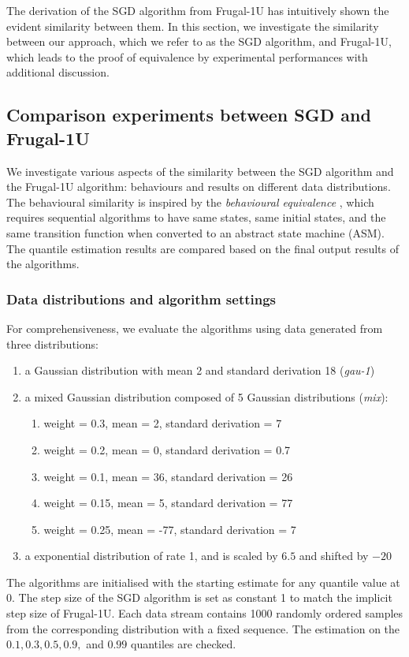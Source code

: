 The derivation of the SGD algorithm from Frugal-1U has intuitively shown the evident similarity between them. In this section, we investigate the similarity between our approach, which we refer to as the SGD algorithm, and Frugal-1U, which leads to the proof of equivalence by experimental performances with additional discussion.

\subsection{Comparison experiments between SGD and Frugal-1U}

We investigate various aspects of the similarity between the SGD algorithm and the Frugal-1U algorithm: behaviours and results on different data distributions. The behavioural similarity is inspired by the \textit{behavioural equivalence} \cite{gurevichSequentialAbstractstateMachines2000}, which requires sequential algorithms to have same states, same initial states, and the same transition function when converted to an abstract state machine (ASM). The quantile estimation results are compared based on the final output results of the algorithms.

\subsubsection{Data distributions and algorithm settings}
\label{subsubsec: distro_and_setting}
For comprehensiveness, we evaluate the algorithms using data generated from three distributions:
    \begin{enumerate}
        \item a Gaussian distribution with mean 2 and standard derivation 18 (\textit{gau-1})
        \item a mixed Gaussian distribution composed of 5 Gaussian distributions (\textit{mix}):
            \begin{enumerate}
                \item weight = 0.3, mean = 2, standard derivation = 7
                \item weight = 0.2, mean = 0, standard derivation = 0.7
                \item weight = 0.1, mean = 36, standard derivation = 26
                \item weight = 0.15, mean = 5, standard derivation = 77
                \item weight = 0.25, mean = -77, standard derivation = 7
            \end{enumerate}
            \item a exponential distribution of rate 1, and is scaled by $6.5$ and shifted by $-20$
    \end{enumerate}
The algorithms are initialised with the starting estimate for any quantile value at $0$. The step size of the SGD algorithm is set as constant 1 to match the implicit step size of Frugal-1U. Each data stream contains 1000 randomly ordered samples from the corresponding distribution with a fixed sequence. The estimation on the $0.1, 0.3, 0.5, 0.9,$ and $0.99$ quantiles are checked.

